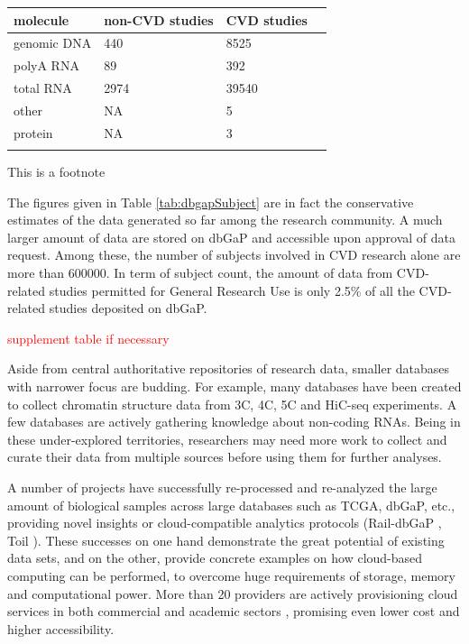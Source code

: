 \documentclass[letter]{bioinfo}
\newcommand{\comment}[1]{\textcolor{red}{#1}}
\begin{document}
\begin{table}[!t]
	 {\begin{tabular}{@{}llll@{}}\toprule 
			molecule &non-CVD studies & CVD studies \\ \midrule
			genomic DNA &            440 &        8525  \\
			polyA RNA &             89 &         392  \\
			total RNA &           2974 &       39540  \\
			other &             NA &           5  \\
			protein &             NA &           3  \\ \botrule
	\end{tabular}}{This is a footnote}
\end{table}

The figures given in Table \ref{tab:dbgapSubject} are in fact the conservative estimates of the data generated so far among the research community. A much larger amount of data are stored on dbGaP and accessible upon approval of data request. Among these, the number of subjects involved in CVD research alone are more than 600000. %
In term of subject count, the amount of data from CVD-related studies permitted for General Research Use is only
2.5\% of all the CVD-related studies deposited on dbGaP.

\comment{supplement table if necessary}

Aside from central authoritative repositories of research data, smaller databases with narrower focus are budding. For example, many databases have been created to collect chromatin structure data from 3C, 4C, 5C and HiC-seq experiments. A few databases are actively gathering knowledge about non-coding RNAs. Being in these under-explored territories, researchers may need more work to collect and curate their data from multiple sources before using them for further analyses.

A number of projects have successfully re-processed and re-analyzed the large amount of biological samples across large databases such as TCGA, dbGaP, etc., providing novel insights or cloud-compatible analytics protocols (Rail-dbGaP \citep{Nellore:2016:RaildbGaP}, Toil \citep{Vivian:2017:Toil}). These successes on one hand demonstrate the great potential of existing data sets, and on the other, provide concrete examples on how cloud-based computing can be performed, to overcome huge requirements of storage, memory and computational power. More than 20 providers are actively provisioning cloud services in both commercial and academic sectors \citep{Langmead:2018:Cloud}, promising even lower cost and higher accessibility.
\end{document}
